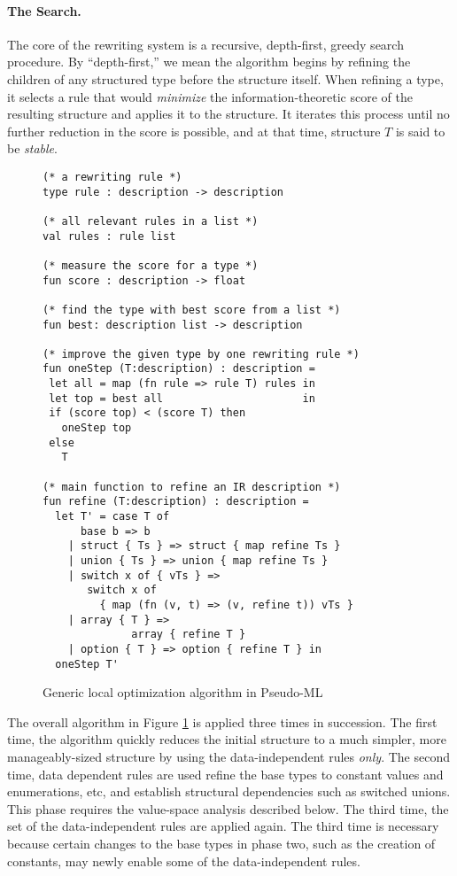\paragraph*{The Search.}
The core of the rewriting system is 
a recursive, depth-first, greedy search procedure. 
By ``depth-first,'' we mean the algorithm begins by refining the 
children of any structured type before
the structure itself. When refining a type, it selects a rule that 
would {\em minimize} the information-theoretic score of the resulting
structure and applies it to the structure.  It iterates this process until
no further reduction in the score is possible, and at
that time, structure $T$ is said to be {\em stable}.

\begin{figure}
{\small 
\begin{verbatim}
(* a rewriting rule *)
type rule : description -> description  

(* all relevant rules in a list *)
val rules : rule list 

(* measure the score for a type *)
fun score : description -> float

(* find the type with best score from a list *)
fun best: description list -> description

(* improve the given type by one rewriting rule *)
fun oneStep (T:description) : description =
 let all = map (fn rule => rule T) rules in
 let top = best all                      in
 if (score top) < (score T) then
   oneStep top
 else
   T

(* main function to refine an IR description *) 
fun refine (T:description) : description =
  let T' = case T of
      base b => b
    | struct { Ts } => struct { map refine Ts }
    | union { Ts } => union { map refine Ts }
    | switch x of { vTs } => 
       switch x of 
         { map (fn (v, t) => (v, refine t)) vTs }
    | array { T } => 
              array { refine T }
    | option { T } => option { refine T } in
  oneStep T'
\end{verbatim}
}
\caption{Generic local optimization algorithm in Pseudo-ML}
\label{fig:refinement}
\end{figure}

The overall algorithm in Figure \ref{fig:refinement} is applied three
times in succession. 
The first time, the algorithm quickly reduces the initial structure to 
a much simpler, more manageably-sized structure by using
the data-independent rules {\em only}. The second time, data dependent
rules are used refine the base types to constant values and enumerations, etc,
and establish structural dependencies such as switched unions. This phase
requires the value-space analysis described below.
The third time, the set of the data-independent rules
are applied again. The third time is necessary because certain changes
to the base types in phase two, such as the creation of constants, may 
newly enable some of the data-independent rules. 

